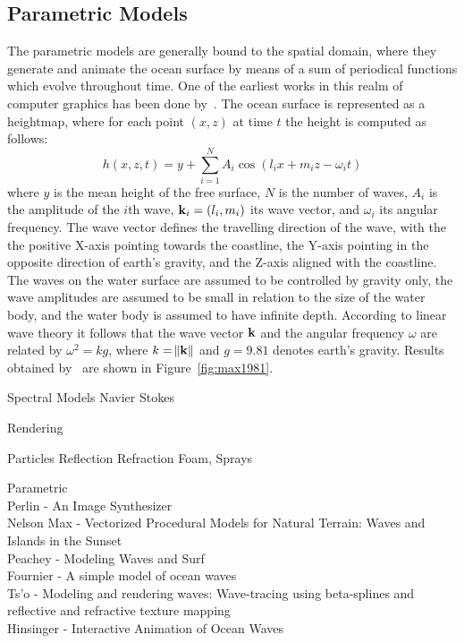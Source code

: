 \subsection{Parametric Models}
%
The parametric models are generally bound to the spatial domain, where they
generate and animate the ocean surface by means of a sum of periodical functions
which evolve throughout time. One of the earliest works in this realm of
computer graphics has been done by~\citet{Max:1981}. The ocean surface is
represented as a heightmap, where for each point $(x,z)$ at time $t$ the height
is computed as follows:
\begin{equation}
h(x,z,t) = y + \sum_{i=1}^N A_i \cos (l_i x + m_i z - \omega_i t)
\end{equation}
where $y$ is the mean height of the free surface, $N$ is the number of waves,
$A_i$ is the amplitude of the $i$th wave, $\mathbf{k}_i = (l_i, m_i)$ its wave
vector, and $\omega_i$ its angular frequency. The wave vector defines the
travelling direction of the wave, with the the positive X-axis pointing towards
the coastline, the Y-axis pointing in the opposite direction of earth's gravity,
and the Z-axis aligned with the coastline. The waves on the water surface are
assumed to be controlled by gravity only, the wave amplitudes are assumed to
be small in relation to the size of the water body, and the water body is
assumed to have infinite depth. According to linear wave theory it follows that
the wave vector $\mathbf{k}$ and the angular frequency $\omega$ are related by
$\omega^2=kg$, where $k=\norm{\mathbf{k}}$ and $g=9.81$ denotes earth's gravity.
Results obtained by~\citet{Max:1981} are shown in Figure~\ref{fig:max1981}.


Spectral Models
Navier Stokes

Rendering

Particles
Reflection
Refraction
Foam, Sprays

Parametric\\
Perlin - An Image Synthesizer \cite{Perlin:1985}\\
Nelson Max - Vectorized Procedural Models for Natural Terrain: Waves and Islands in the Sunset \cite{Max:1981}\\
Peachey - Modeling Waves and Surf \cite{Peachey:1986}\\
Fournier - A simple model of ocean waves \cite{Fournier:1986}\\
Ts'o - Modeling and rendering waves: Wave-tracing using beta-splines and reflective and refractive texture mapping \cite{Ts'o:1987}\\Hinsinger - Interactive Animation of Ocean Waves \cite{Hinsinger:2002}\\


